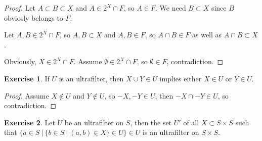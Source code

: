 \documentclass[8pt]{article}
\theoremstyle{definition}
\theoremstyle{definition}
\theoremstyle{definition}
\theoremstyle{definition}
\theoremstyle{definition}
\theoremstyle{definition}
\theoremstyle{definition}
\theoremstyle{definition}
\theoremstyle{definition}
\theoremstyle{definition}
\theoremstyle{definition}
\theoremstyle{definition}
\theoremstyle{definition}
\newtheorem{exercise}{Exercise}[section]
\theoremstyle{definition}
\theoremstyle{question}
\begin{document}
\begin{proof}
  Let $A \subset B \subset X$ and $A \in 2^X \cap F$, so $A \in F$. We need $B \subset X$ since $B$ obviosly belongs to $F$.

  Let $A, B \in 2^X \cap F$, so $A, B \subset X$ and $A, B \in F$, so $A \cap B \in F$ as well as
  $A \cap B \subset X$.

  Obviously, $X \in 2^X \cap F$. Assume $\emptyset \in 2^X \cap F$, so $\emptyset \in F$, contradiction.

\end{proof}

\begin{exercise}
  If $U$ is an ultrafilter, then $X \cup Y \in U$ implies either $X \in U$ or $Y \in U$.
\end{exercise}

\begin{proof}
  Assume $X \notin U$ and $Y \notin U$, so $- X, -Y \in U$, then $-X \cap -Y \in U$, so contradiction.
\end{proof}

\begin{exercise}
  Let $U$ be an ultrafilter on $S$, then the set $U'$ of all $X \subset S \times S$
  such that $\{ a \in S \: | \: \{ b \in S \:| \: (a, b) \in X \} \in U\} \in U$ is an ultrafilter on $S \times S$.
\end{exercise}
\end{document}
